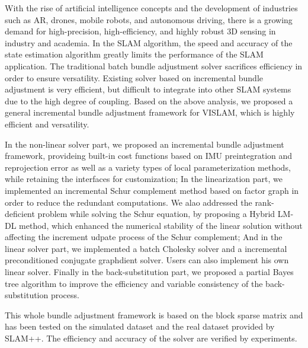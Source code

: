 \begin{englishabstract}
    With the rise of artificial intelligence concepts and the development of industries such as AR, drones, mobile robots, and autonomous driving, there is a growing demand for high-precision, high-efficiency, and highly robust 3D sensing in industry and academia. In the SLAM algorithm, the speed and accuracy of the state estimation algorithm greatly limits the performance of the SLAM application. The traditional batch bundle adjustment solver sacrifices efficiency in order to ensure versatility. Existing solver based on incremental bundle adjustment is very efficient, but difficult to integrate into other SLAM systems due to the high degree of coupling. Based on the above analysis, we proposed a general incremental bundle adjustment framework for VISLAM, which is highly efficient and versatility.

    In the non-linear solver part, we proposed an incremental bundle adjustment framework, provideing built-in cost functions based on IMU preintegration and reprojection error as well as a variety types of local parameterization methods, while retaining the interfaces for customization; In the linearization part, we implemented an incremental Schur complement method based on factor graph in order to reduce the redundant computations. We alao addressed the rank-deficient problem while solving the Schur equation, by proposing a Hybrid LM-DL method, which enhanced the numerical stability of the linear solution without affecting the increment udpate process of the Schur complement; And in the linear solver part, we implemented a batch Cholesky solver and a incremental preconditioned conjugate graphdient solver. Users can also implement his own linear solver. Finally in the back-substitution part, we proposed a partial Bayes tree algorithm to improve the efficiency and variable consistency of the back-substitution process.

    This whole bundle adjustment framework is based on the block sparse matrix and has been tested on the simulated dataset and the real dataset provided by SLAM++. The efficiency and accuracy of the solver are verified by experiments.

\end{englishabstract}
